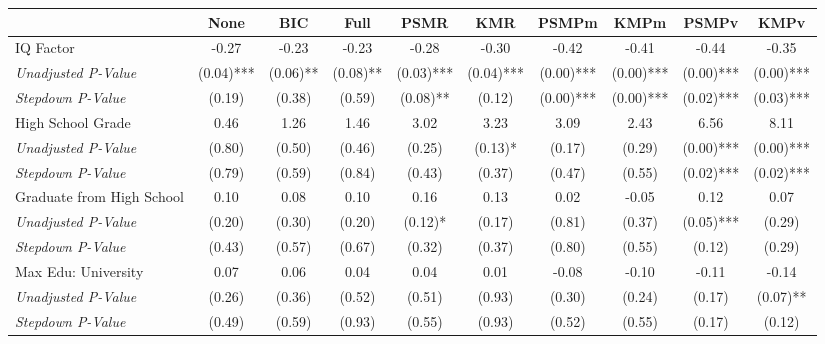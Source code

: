 \begin{tabular}{l c c c c c c c c c}
\toprule
 & None & BIC & Full & PSMR & KMR & PSMPm & KMPm & PSMPv & KMPv \\
\midrule
IQ Factor & -0.27 & -0.23 & -0.23 & -0.28 & -0.30 & -0.42 & -0.41 & -0.44 & -0.35 \\
\quad \textit{Unadjusted P-Value} & (0.04)*** & (0.06)** & (0.08)** & (0.03)*** & (0.04)*** & (0.00)*** & (0.00)*** & (0.00)*** & (0.00)*** \\
\quad \textit{Stepdown P-Value} & (0.19) & (0.38) & (0.59) & (0.08)** & (0.12) & (0.00)*** & (0.00)*** & (0.02)*** & (0.03)*** \\
High School Grade & 0.46 & 1.26 & 1.46 & 3.02 & 3.23 & 3.09 & 2.43 & 6.56 & 8.11 \\
\quad \textit{Unadjusted P-Value} & (0.80) & (0.50) & (0.46) & (0.25) & (0.13)* & (0.17) & (0.29) & (0.00)*** & (0.00)*** \\
\quad \textit{Stepdown P-Value} & (0.79) & (0.59) & (0.84) & (0.43) & (0.37) & (0.47) & (0.55) & (0.02)*** & (0.02)*** \\
Graduate from High School & 0.10 & 0.08 & 0.10 & 0.16 & 0.13 & 0.02 & -0.05 & 0.12 & 0.07 \\
\quad \textit{Unadjusted P-Value} & (0.20) & (0.30) & (0.20) & (0.12)* & (0.17) & (0.81) & (0.37) & (0.05)*** & (0.29) \\
\quad \textit{Stepdown P-Value} & (0.43) & (0.57) & (0.67) & (0.32) & (0.37) & (0.80) & (0.55) & (0.12) & (0.29) \\
Max Edu: University & 0.07 & 0.06 & 0.04 & 0.04 & 0.01 & -0.08 & -0.10 & -0.11 & -0.14 \\
\quad \textit{Unadjusted P-Value} & (0.26) & (0.36) & (0.52) & (0.51) & (0.93) & (0.30) & (0.24) & (0.17) & (0.07)** \\
\quad \textit{Stepdown P-Value} & (0.49) & (0.59) & (0.93) & (0.55) & (0.93) & (0.52) & (0.55) & (0.17) & (0.12) \\
\bottomrule
\end{tabular}
